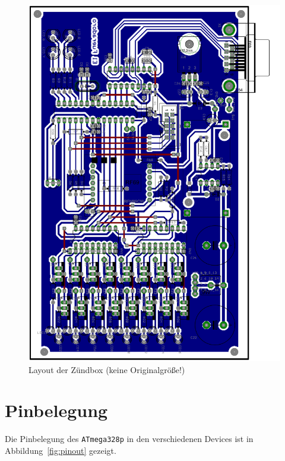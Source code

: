 \documentclass[pdftex, parskip, numbers=noenddot, toc=listof]{scrbook}
\begin{document}
	\begin{figure}
		\centering
		\includegraphics[height=.95\textheight,keepaspectratio]{Bilder/Zuendboxlayout}
		\caption{Layout der Zündbox (keine Originalgröße!)}
		\label{fig:zuendboxlayout}
	\end{figure}

	\begin{refsection}
		\newrefcontext[sorting=nty]
		\nocite{*} %
		\printbibliography[title=Datenblätter, heading=bibnumbered]
	\end{refsection}

	\chapter{Pinbelegung}
	\label{ch:pinbelegung}

	Die Pinbelegung des \texttt{ATmega328p} in den verschiedenen Devices ist in Abbildung~\ref{fig:pinout} gezeigt.
\end{document}
